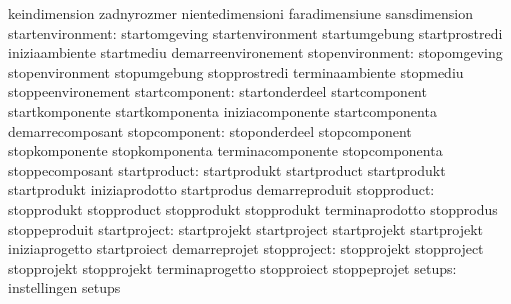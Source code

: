                                   keindimension                    zadnyrozmer
                                  nientedimensioni                 faradimensiune
                                  sansdimension
                startenvironment: startomgeving                    startenvironment
                                  startumgebung                    startprostredi
                                  iniziaambiente                   startmediu
                                  demarreenvironement
                 stopenvironment: stopomgeving                     stopenvironment
                                  stopumgebung                     stopprostredi
                                  terminaambiente                  stopmediu
                                  stoppeenvironement
                  startcomponent: startonderdeel                   startcomponent
                                  startkomponente                  startkomponenta
                                  iniziacomponente                 startcomponenta
                                  demarrecomposant
                   stopcomponent: stoponderdeel                    stopcomponent
                                  stopkomponente                   stopkomponenta
                                  terminacomponente                stopcomponenta
                                  stoppecomposant
                    startproduct: startprodukt                     startproduct
                                  startprodukt                     startprodukt
                                  iniziaprodotto                   startprodus
                                  demarreproduit
                     stopproduct: stopprodukt                      stopproduct
                                  stopprodukt                      stopprodukt
                                  terminaprodotto                  stopprodus
                                  stoppeproduit
                    startproject: startprojekt                     startproject
                                  startprojekt                     startprojekt
                                  iniziaprogetto                   startproiect
                                  demarreprojet
                     stopproject: stopprojekt                      stopproject
                                  stopprojekt                      stopprojekt
                                  terminaprogetto                  stopproiect
                                  stoppeprojet
                          setups: instellingen                     setups

